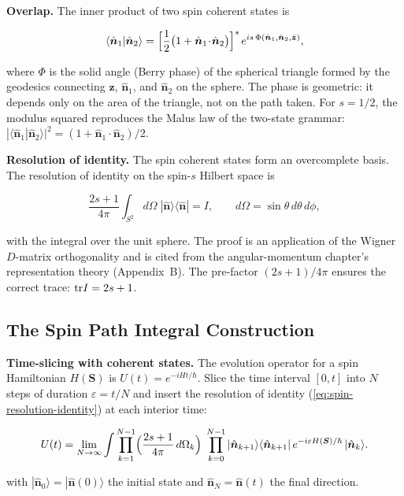 \medskip\noindent\textbf{Overlap.} The inner product of two spin coherent states is
\begin{linenomath}
\begin{equation}
\langle\hat{\bm n}_{1}|\hat{\bm n}_{2}\rangle
= \Bigl[\frac{1}{2}\bigl(1 + \hat{\bm n}_{1}\!\cdot\!\hat{\bm n}_{2}\bigr)\Bigr]^{s}\,
e^{i s\,\Phi(\hat{\bm n}_{1},\hat{\bm n}_{2},\hat{\bm z})},
\label{eq:spin-coherent-overlap}
\end{equation}
\end{linenomath}
where $\Phi$ is the solid angle (Berry phase) of the spherical triangle formed by the geodesics connecting $\hat{\bm z}$, $\hat{\bm n}_{1}$, and $\hat{\bm n}_{2}$ on the sphere. The phase is geometric: it depends only on the area of the triangle, not on the path taken. For $s=1/2$, the modulus squared reproduces the Malus law of the two-state grammar: $|\langle\hat{\bm n}_{1}|\hat{\bm n}_{2}\rangle|^{2} = (1 + \hat{\bm n}_{1}\!\cdot\!\hat{\bm n}_{2})/2$.

\medskip\noindent\textbf{Resolution of identity.} The spin coherent states form an overcomplete basis. The resolution of identity on the spin-$s$ Hilbert space is
\begin{linenomath}
\begin{equation}
\frac{2s+1}{4\pi}\int_{S^{2}} d\Omega\;|\hat{\bm n}\rangle\langle\hat{\bm n}| = I,
\qquad d\Omega = \sin\theta\,d\theta\,d\phi,
\label{eq:spin-resolution-identity}
\end{equation}
\end{linenomath}
with the integral over the unit sphere. The proof is an application of the Wigner $D$-matrix orthogonality and is cited from the angular-momentum chapter's representation theory (Appendix~B). The pre-factor $(2s+1)/4\pi$ ensures the correct trace: $\mathrm{tr} I = 2s+1$.

\subsection{The Spin Path Integral Construction}

\medskip\noindent\textbf{Time-slicing with coherent states.} The evolution operator for a spin Hamiltonian $H(\bm S)$ is $U(t) = e^{-iHt/\hbar}$. Slice the time interval $[0,t]$ into $N$ steps of duration $\varepsilon = t/N$ and insert the resolution of identity (\eqref{eq:spin-resolution-identity}) at each interior time:
\begin{linenomath}
\begin{equation}
U(t) = \lim_{N\to\infty}\int \prod_{k=1}^{N-1}\Bigl(\frac{2s+1}{4\pi}\,d\Omega_{k}\Bigr)\;
\prod_{k=0}^{N-1}|\hat{\bm n}_{k+1}\rangle\langle\hat{\bm n}_{k+1}|\,
e^{-i\varepsilon H(\bm S)/\hbar}\,|\hat{\bm n}_{k}\rangle .
\label{eq:spin-time-slicing}
\end{equation}
\end{linenomath}
with $|\hat{\bm n}_{0}\rangle = |\hat{\bm n}(0)\rangle$ the initial state and $\hat{\bm n}_{N} = \hat{\bm n}(t)$ the final direction.


